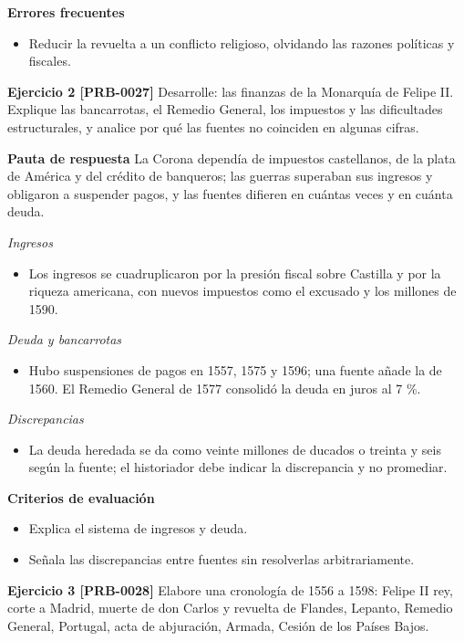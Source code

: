 \documentclass{book}
\begin{document}
\noindent\textbf{Errores frecuentes}
\begin{itemize}
\item Reducir la revuelta a un conflicto religioso, olvidando las razones políticas y fiscales.
\end{itemize}

\noindent\textbf{Ejercicio 2 [PRB-0027]}
Desarrolle: las finanzas de la Monarquía de Felipe II. Explique las bancarrotas, el Remedio General, los impuestos y las dificultades estructurales, y analice por qué las fuentes no coinciden en algunas cifras.


\noindent\textbf{Pauta de respuesta}
La Corona dependía de impuestos castellanos, de la plata de América y del crédito de banqueros; las guerras superaban sus ingresos y obligaron a suspender pagos, y las fuentes difieren en cuántas veces y en cuánta deuda.


\noindent\textit{Ingresos}
\begin{itemize}
\item Los ingresos se cuadruplicaron por la presión fiscal sobre Castilla y por la riqueza americana, con nuevos impuestos como el excusado y los millones de 1590.
\end{itemize}

\noindent\textit{Deuda y bancarrotas}
\begin{itemize}
\item Hubo suspensiones de pagos en 1557, 1575 y 1596; una fuente añade la de 1560. El Remedio General de 1577 consolidó la deuda en juros al 7 \%.
\end{itemize}

\noindent\textit{Discrepancias}
\begin{itemize}
\item La deuda heredada se da como veinte millones de ducados o treinta y seis según la fuente; el historiador debe indicar la discrepancia y no promediar.
\end{itemize}

\noindent\textbf{Criterios de evaluación}
\begin{itemize}
\item Explica el sistema de ingresos y deuda.
\item Señala las discrepancias entre fuentes sin resolverlas arbitrariamente.
\end{itemize}

\noindent\textbf{Ejercicio 3 [PRB-0028]}
Elabore una cronología de 1556 a 1598: Felipe II rey, corte a Madrid, muerte de don Carlos y revuelta de Flandes, Lepanto, Remedio General, Portugal, acta de abjuración, Armada, Cesión de los Países Bajos.
\end{document}
